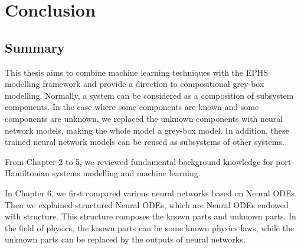 \documentclass[
	parskip, 			   %
	twoside, 			   %
	DIV=14, 			   %
	BCOR=15.0mm, 		   %
	headsepline, 		   %
	open=right, 		   %
	captions=tableheading, %
	bibliography=totoc,    %
	numbers=noenddot       %
]{scrreprt}
\begin{document}
\begin{figure}[h!]
    \label{fig:ndho_experiment_with_EPHS_structure_reuse}
\end{figure}

\clearpage
\chapter{Conclusion}
\label{ch:chapter8}
\section{Summary}
This thesis aims to combine machine learning techniques with the EPHS modelling framework and provide a direction to compositional grey-box modelling. Normally, a system can be considered as a composition of subsystem components. In the case where some components are known and some components are unknown, we replaced the unknown components with neural network models, making the whole model a grey-box model. In addition, these trained neural network models can be reused as subsystems of other systems.

From Chapter 2 to 5, we reviewed fundamental background knowledge for port-Hamiltonian systems modelling and machine learning. 

In Chapter 6, we first compared various neural networks based on Neural ODEs. Then we explained structured Neural ODEs, which are Neural ODEs endowed with structure. This structure composes the known parts and unknown parts. In the field of physics, the known parts can be some known physics laws, while the unknown parts can be replaced by the outputs of neural networks.
\end{document}
